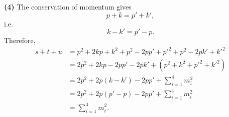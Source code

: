 \documentclass{article}
\makeatletter
\newcommand*{\shifttext}[1]{%
  \settowidth{\@tempdima}{#1}%
  \hspace{-\@tempdima}#1%
}
\newcommand{\plabel}[1]{%
\shifttext{\textbf{#1}\quad}%
}
\makeatother
\begin{document}
\plabel{(4)}%
The conservation of momentum gives
\[ p+k = p'+k', \]
i.e.
\[ k - k' = p' - p. \]
Therefore,
\begin{align*}
    s + t + u &= p^2 + 2kp + k^2 + p^2 - 2pp' + p'^2 + p^2 - 2pk' + k'^2 \\
    &= 2p^2 + 2kp - 2pp' - 2pk' + (p^2 + k^2 + p'^2 + k'^2) \\
    &= 2p^2 + 2p(k-k') - 2pp' + \sum_{i=1}^4 m_i^2 \\
    &= 2p^2 + 2p(p'-p) - 2pp' + \sum_{i=1}^4 m_i^2 \\
    &= \sum_{i=1}^4 m_i^2.
\end{align*}
\end{document}
